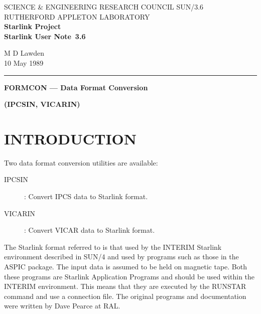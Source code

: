 \pagestyle{myheadings}

\newcommand{\stardoccategory}  {Starlink User Note}
\newcommand{\stardocinitials}  {SUN}
\newcommand{\stardocnumber}    {3.6}
\newcommand{\stardocauthors}   {M D Lawden}
\newcommand{\stardocdate}      {10 May 1989}
\newcommand{\stardoctitle}     {FORMCON --- Data Format Conversion}

\newcommand{\stardocname}{\stardocinitials /\stardocnumber}
\markright{\stardocname}
\setlength{\textwidth}{160mm}
\setlength{\textheight}{240mm}
\setlength{\topmargin}{-5mm}
\setlength{\oddsidemargin}{0mm}
\setlength{\evensidemargin}{0mm}
\setlength{\parindent}{0mm}
\setlength{\parskip}{\medskipamount}
\setlength{\unitlength}{1mm}


\thispagestyle{empty}
SCIENCE \& ENGINEERING RESEARCH COUNCIL \hfill \stardocname\\
RUTHERFORD APPLETON LABORATORY\\
{\large\bf Starlink Project\\}
{\large\bf \stardoccategory\ \stardocnumber}
\begin{flushright}
\stardocauthors\\
\stardocdate
\end{flushright}
\vspace{-4mm}
\rule{\textwidth}{0.5mm}
\vspace{5mm}
\begin{center}
{\Large\bf \stardoctitle}
\end{center}
\begin{center}
{\Large\bf (IPCSIN, VICARIN)}
\end{center}
\vspace{5mm}

\section {INTRODUCTION}

Two data format conversion utilities are available:
\begin{description}
\begin{description}
\item[IPCSIN]: Convert IPCS data to Starlink format.
\item[VICARIN]: Convert VICAR data to Starlink format.
\end{description}
\end{description}
The Starlink format referred to is that used by the INTERIM Starlink
environment described in SUN/4 and used by programs such as those in the ASPIC
package.
The input data is assumed to be held on magnetic tape.
Both these programs are Starlink Application Programs and should be used within
the INTERIM environment.
This means that they are executed by the RUNSTAR command and use a connection
file.
The original programs and documentation were written by Dave Pearce at RAL.
